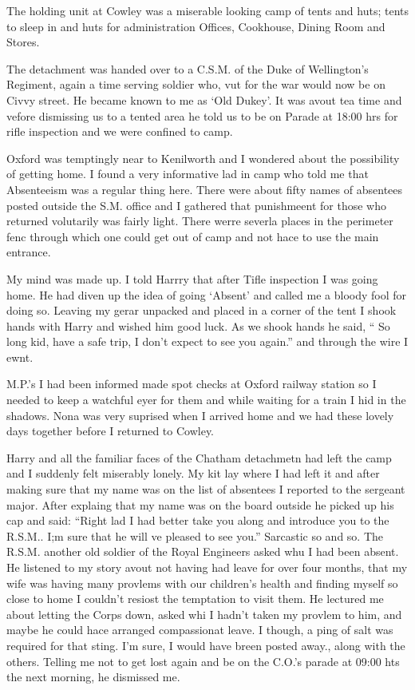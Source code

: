 The holding unit at Cowley was a miserable looking camp of tents and
huts; tents to sleep in and huts for administration Offices,
Cookhouse, Dining Room and Stores.

The detachment was handed over to a C.S.M. of the Duke of Wellington's
Regiment, again a time serving soldier who, vut for the war would now
be on Civvy street. He became known to me as `Old Dukey'. It was avout
tea time and vefore dismissing us to a tented area he told us to be on
Parade at 18:00 hrs for rifle inspection and we were confined to camp.

Oxford was temptingly near to Kenilworth and I wondered about the
possibility of getting home. I found a very informative lad in camp
who told me that Absenteeism was a regular thing here. There were
about fifty names of absentees posted outside the S.M. office and I
gathered that punishmeent for those who returned volutarily was fairly
light. There werre severla places in the perimeter fenc through which
one could get out of camp and not hace to use the main entrance.

My mind was made up. I told Harrry that after Tifle inspection I was
going home. He had diven up the idea of going `Absent' and called me a
bloody fool for doing so. Leaving my gerar unpacked and placed in a
corner of the tent I shook hands with Harry and wished him good
luck. As we shook hands he said, `` So long kid, have a safe trip, I
don't expect to see you again.'' and through the wire I ewnt.

M.P.'s I had been informed made spot checks at Oxford railway station
so I needed to keep a watchful eyer for them and while waiting for a
train I hid in the shadows. Nona was very suprised when I arrived home
and we had these lovely days together before I returned to Cowley.

Harry and all the familiar faces of the Chatham detachmetn had left
the camp and I suddenly felt miserably lonely. My kit lay where I had
left it and after making sure that my name was on the list of
absentees I reported to the sergeant major. After explaing that my
name was on the board outside he picked up his cap and said: ``Right
lad I had better take you along and introduce you to the R.S.M.. I;m
sure that he will ve pleased to see you.'' Sarcastic so and so. The
R.S.M. another old soldier of the Royal Engineers asked whu I had been
absent. He listened to my story avout not having had leave for over
four months, that my wife was having many provlems with our children's
health and finding myself so close to home I couldn't resiost the
temptation to visit them. He lectured me about letting the Corps down,
asked whi I hadn't taken my provlem to him, and maybe he could hace
arranged compassionat leave. I though, a ping of salt was required for
that sting. I'm sure, I would have breen posted away., along with the
others. Telling me not to get lost again and be on the C.O.'s parade
at 09:00 hts the next morning, he dismissed me.

